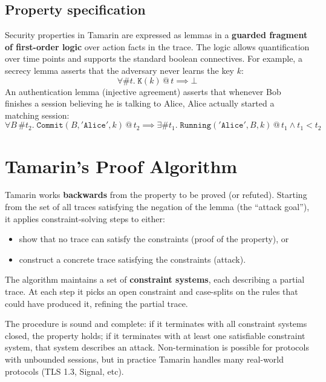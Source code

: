 \documentclass[oneside]{academica}
\begin{document}
\subsection{Property specification}

Security properties in Tamarin are expressed as lemmas in a \textbf{guarded fragment of first-order logic} over action facts in the trace.
The logic allows quantification over time points and supports the standard boolean connectives.
For example, a secrecy lemma asserts that the adversary never learns the key $k$:
\begin{equation*}
  \forall \#t.\; \mathtt{K}(k) \mathrel{@} t \implies \bot
\end{equation*}
An authentication lemma (injective agreement) asserts that whenever Bob finishes a session believing he is talking to Alice, Alice actually started a matching session:
\begin{equation*}
  \forall B\, \#t_2.\; \mathtt{Commit}(B, \mathtt{'Alice'}, k) \mathrel{@} t_2 \implies \exists \#t_1.\; \mathtt{Running}(\mathtt{'Alice'}, B, k) \mathrel{@} t_1 \land t_1 < t_2
\end{equation*}

\section{Tamarin's Proof Algorithm}

Tamarin works \textbf{backwards} from the property to be proved (or refuted). Starting from the set of all traces satisfying the negation of the lemma (the ``attack goal''), it applies constraint-solving steps to either:
\begin{itemize}
  \item show that no trace can satisfy the constraints (proof of the property), or
  \item construct a concrete trace satisfying the constraints (attack).
\end{itemize}
The algorithm maintains a set of \textbf{constraint systems}, each describing a partial trace. At each step it picks an open constraint and case-splits on the rules that could have produced it, refining the partial trace.

The procedure is sound and complete: if it terminates with all constraint systems closed, the property holds; if it terminates with at least one satisfiable constraint system, that system describes an attack. Non-termination is possible for protocols with unbounded sessions, but in practice Tamarin handles many real-world protocols (TLS 1.3, Signal, etc).
\end{document}
